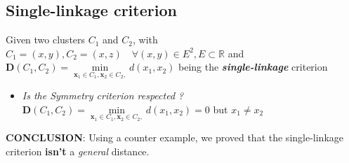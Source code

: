 \documentclass{article}
\begin{document}
\subsection{Single-linkage criterion}
 Given two clusters $C_1$ and $C_2$, with $C_1 = (x,y), C_2=(x,z) \quad \forall (x,y) \in E^2, E \subset \mathbb{R}$ and $\mathbf{D}(C_1,C_2) = \underset{\mathbf{x}_1 \in C_1,\mathbf{x}_2 \in C_2,}\min d(x_1,x_2)$ being the \textit{\textbf{single-linkage}} criterion
\begin{itemize}
    \item\textit{ Is the Symmetry criterion respected ?}
    \newline $\mathbf{D}(C_1,C_2) = \underset{\mathbf{x}_1 \in C_1,\mathbf{x}_2 \in C_2,}\min d(x_1,x_2) =  0$ but $x_1 \neq x_2$
\end{itemize}
\textbf{CONCLUSION}: Using a counter example, we proved that the single-linkage criterion \textbf{isn't} a \textit{general} distance.
\end{document}
